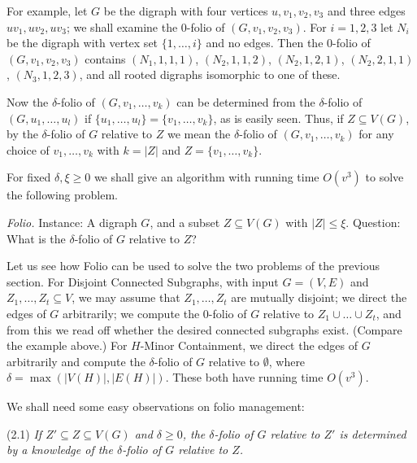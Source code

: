 For example, let $G$ be the digraph with four vertices $u, v_1, v_2, v_3$ and three edges $uv_1, uv_2, uv_3$; we shall examine the $0$-folio of $(G, v_1, v_2, v_3)$. For $i = 1, 2, 3$ let $N_i$ be the digraph with vertex set $\{1, \dots, i\}$ and no edges. Then the $0$-folio of $(G, v_1, v_2, v_3)$ contains $(N_1, 1, 1, 1)$, $(N_2, 1, 1, 2)$, $(N_2, 1, 2, 1)$, $(N_2, 2, 1, 1)$, $(N_3, 1, 2, 3)$, and all rooted digraphs isomorphic to one of these.

Now the $\delta$-folio of $(G, v_1, \dots, v_k)$ can be determined from the $\delta$-folio of $(G, u_1, \dots, u_l)$ if $\{u_1, \dots, u_l\} = \{v_1, \dots, v_k\}$, as is easily seen. Thus, if $Z \subseteq V(G)$, by the $\delta$-folio of $G$ relative to $Z$ we mean the $\delta$-folio of $(G, v_1, \dots, v_k)$ for any choice of $v_1, \dots, v_k$ with $k = |Z|$ and $Z = \{v_1, \dots, v_k\}$.

For fixed $\delta, \xi \ge 0$ we shall give an algorithm with running time $O(v^3)$ to solve the following problem.

\textit{Folio.} Instance: A digraph $G$, and a subset $Z \subseteq V(G)$ with $|Z| \le \xi$. Question: What is the $\delta$-folio of $G$ relative to $Z$?

Let us see how Folio can be used to solve the two problems of the previous section. For Disjoint Connected Subgraphs, with input $G = (V, E)$ and $Z_1, \dots, Z_t \subseteq V$, we may assume that $Z_1, \dots, Z_t$ are mutually disjoint; we direct the edges of $G$ arbitrarily; we compute the $0$-folio of $G$ relative to $Z_1 \cup \dots \cup Z_t$, and from this we read off whether the desired connected subgraphs exist. (Compare the example above.) For $H$-Minor Containment, we direct the edges of $G$ arbitrarily and compute the $\delta$-folio of $G$ relative to $\emptyset$, where $\delta = \max(|V(H)|, |E(H)|)$. These both have running time $O(v^3)$.

We shall need some easy observations on folio management:

\stmt
(2.1) \textit{If $Z' \subseteq Z \subseteq V(G)$ and $\delta \ge 0$, the $\delta$-folio of $G$ relative to $Z'$ is determined by a knowledge of the $\delta$-folio of $G$ relative to $Z$.}

